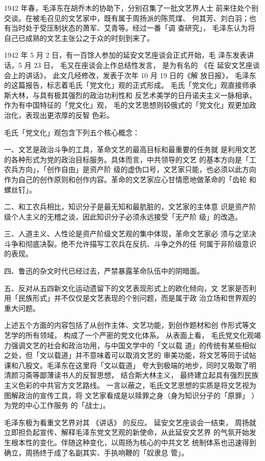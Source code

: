 1942 年春，毛泽东在胡乔木的协助下，分别召集了一批文艺界人士
前来住处个别交谈。在被毛召见的文艺家中，既有属于周扬派的陈荒煤、
何其芳、刘白羽；也有当时处于受压制状态的萧军、艾青等。经过一番「调
查研究」，
毛泽东认为将自己已成熟的文艺主张公之于众的时刻到来了。

1942 年 5 月 2 日，有一百馀人参加的延安文艺座谈会正式开始，毛
泽东发表讲话，5 月 23 日，
毛又在座谈会上作总结性发言，
是为有名的
《在
延安文艺座谈会上的讲话》，
此文几经修改，发表于次年 10 月 19 日的《解
放日报》，
毛泽东的这篇报告，标志着毛氏「党文化」观的正式形成。
毛氏「党文化」观直接师承斯大林，与具有极其强烈的政治功利性和
反艺术美学的日丹诺夫主义一脉相承，作为有中国特征的「党文化」观，
毛的文艺思想则较俄式的「党文化」观更加政治化，表现出更浓厚的反智
色彩。

毛氏「党文化」观包含下列五个核心概念：

一、文艺是政治斗争的工具，革命文艺的最高目标和最重要的任务就 是利用文艺
的各种形式为党的政治目标服务。具体而言，中共领导的文艺 的基本方向是「工
农兵方向」，「创作自由」是资产阶
级的虚伪口号，文艺家只能，也必须以此方向作为自己的创作原则和创作内容。革命的文艺家应心甘情愿地做革命的「齿轮
和螺丝钉」。

二、和工农兵相比，知识分子是最无知和最肮脏的，文艺家的主体意
识是资产阶级个人主义的无稽之谈，因此知识分子必须永远接受「无产阶
级」的改造。

三、人道主义、人性论是资产阶级文艺观的集中体现，革命文艺家必
须与之坚决斗争和彻底决裂。绝不允许描写工农兵在反抗、斗争之外的任
何属于非阶级意识的表现。

四、鲁迅的杂文时代已经过去，严禁暴露革命队伍中的阴暗面。

五、反对从五四新文化运动遗留下的文艺表现形式上的欧化倾向，文
艺家是否利用「民族形式」并不仅仅是文艺表现的个别问题，而是属于政
治立场和世界观的重大问题。

上述五个方面的内容包括了从创作主体、文艺功能，到创作题材和创
作形式等文艺学的所有领域，
构成了一个严密的党文化体系。
从表面上看，
毛氏党文化观竭力强调文艺的社会和政治功用，与中国文学中的「文以载
道」的传统有某些相似之处，但「文以载道」并不意味着可以取消文艺的
审美功能，将文艺等同于试帖课和八股文。毛泽东在这里将「文以载道」
夸大到极端的地步，同时又吸取了明清颜习斋等鄙薄读书人的反智思想，
结合斯大林主义，
最终建立起具有强烈民族主义色彩的中共官方文艺路线。
一言以蔽之，毛氏文艺思想的实质是将文艺视为图解政治的宣传工具，将
文艺家看成是以赎罪之身（身为知识分子的「原罪」
）为党的中心工作服务
的「战士」。

毛泽东极为看重文艺界对其
《讲话》
的反应。
延安文艺座谈会一结束，
周扬就立即担负起宣传、解释毛泽东党文艺观的新使命，从此延安文艺界
的气氛开始发生根本性的变化。伴随这种变化，以周扬为核心的中共文艺
统制体系也迅速得到确立，周扬终于成了名副其实、手执响鞭的「奴隶总
管」。


